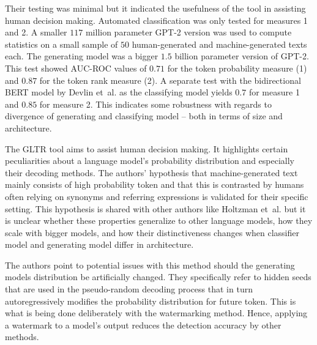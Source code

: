    Their testing was minimal but it indicated the usefulness of the tool in assisting human decision making.
    Automated classification was only tested for measures 1 and 2.
    A smaller $117$ million parameter GPT-2 \cite{radford2019language} version was used to compute statistics on a small sample of $50$ human-generated and machine-generated texts each.
    The generating model was a bigger $1.5$ billion parameter version of GPT-2.
    This test showed AUC-ROC values of $0.71$ for the token probability measure (1) and $0.87$ for the token rank measure (2).
    A separate test with the bidirectional BERT model by Devlin et~al. \cite{devlin2019bert} as the classifying model yields $0.7$ for measure 1 and $0.85$ for measure 2.
    This indicates some robustness with regards to divergence of generating and classifying model -- both in terms of size and architecture.

    \begin{remark}
        The GLTR tool aims to assist human decision making.
        It highlights certain peculiarities about a language model's probability distribution and especially their decoding methods.
        The authors' hypothesis that machine-generated text mainly consists of high probability token and that this is contrasted by humans often relying on synonyms and referring expressions is validated for their specific setting.
        This hypothesis is shared with other authors like Holtzman et~al. \cite{holtzman2020curious} but it is unclear whether these properties generalize to other language models, how they scale with bigger models, and how their distinctiveness changes when classifier model and generating model differ in architecture.

        The authors point to potential issues with this method should the generating models distribution be artificially changed.
        They specifically refer to hidden seeds that are used in the pseudo-random decoding process that in turn autoregressively modifies the probability distribution for future token.
        This is what is being done deliberately with the watermarking method.
        Hence, applying a watermark to a model's output reduces the detection accuracy by other methods.
    \end{remark}

